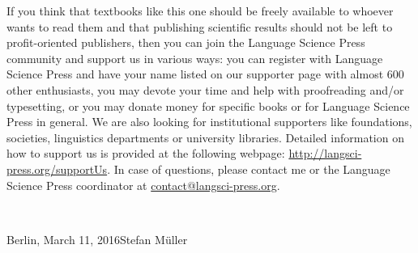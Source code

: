 If you think that textbooks like this one should be freely available to whoever wants to read them
and that publishing scientific results should not be left to profit-oriented publishers, then you
can join the Language Science Press community and support us in various ways: you can register with Language Science Press and have your name
listed on our supporter page with almost 600 other enthusiasts, you may devote your time and help
with proofreading and/or typesetting, or you may donate money for specific books or for Language
Science Press in general. We are also looking for institutional supporters like foundations,
societies, linguistics departments or university libraries. Detailed information on how to support
us is provided at the following webpage: \url{http://langsci-press.org/supportUs}.
In case of questions, please contact me or the Language Science Press coordinator at \href{mailto:contact@langsci-press.org}{contact@langsci-press.org}.


~\medskip

\noindent
Berlin, March 11, 2016\hfill Stefan Müller


